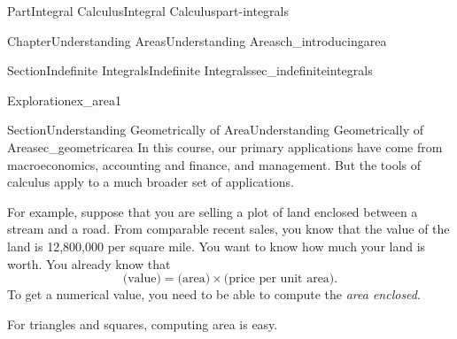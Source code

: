 \documentclass[oneside,10pt,]{tufte-book}
\numberwithin{equation}{chapter}
\begin{document}
\begin{partptx}{Part}{Integral Calculus}{}{Integral Calculus}{}{}{part-integrals}
\begin{chapterptx}{Chapter}{Understanding Areas}{}{Understanding Areas}{}{}{ch_introducingarea}
\begin{sectionptx}{Section}{Indefinite Integrals}{}{Indefinite Integrals}{}{}{sec_indefiniteintegrals}
\begin{exploration}{Exploration}{}{ex_area1}
\begin{enumerate}[font=\bfseries,label=(\alph*),ref=\alph*]
\end{enumerate}%
\end{exploration}%
\end{sectionptx}
%
%
\typeout{************************************************}
\typeout{************************************************}
%
\begin{sectionptx}{Section}{Understanding Geometrically of Area}{}{Understanding Geometrically of Area}{}{}{sec_geometricarea}
In this course, our primary applications have come from macroeconomics, accounting and finance, and management. But the tools of calculus apply to a much broader set of applications.%
\par
For example, suppose that you are selling a plot of land enclosed between a stream and a road. From comparable recent sales, you know that the value of the land is \textdollar{}12,800,000 \textdollar{} per square mile. You want to know how much your land is worth. You already know that%
\begin{equation*}
\text{(value)} = \text{(area)} \times \text{(price per unit area)}\text{.}
\end{equation*}
To get a numerical value, you need to be able to compute the \emph{area enclosed}.%
\begin{image}{0.25}{0.5}{0.25}{}%
%
\end{image}%
For triangles and squares, computing area is easy.%
\begin{enumerate}

\end{enumerate}
\end{sectionptx}
\end{chapterptx}
\end{partptx}
\end{document}
